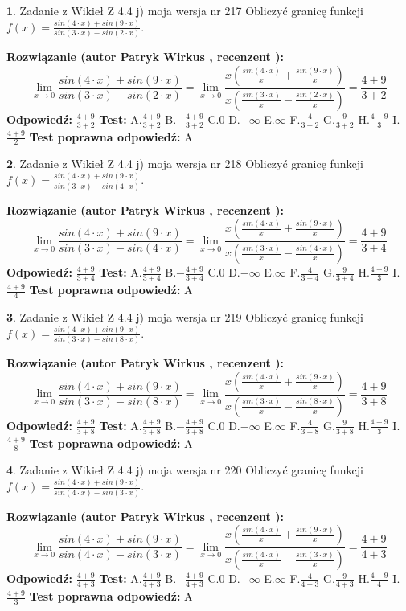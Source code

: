 \documentclass[12pt, a4paper]{article}
\theoremstyle{definition} %
\newtheorem{zad}{}
\newcommand{\zadStart}[1]{\begin{zad}#1\newline}
\newcommand{\zadStop}{\end{zad}}
\newcommand{\rozwStart}[2]{\noindent \textbf{Rozwiązanie (autor #1 , recenzent #2): }\newline}
\newcommand{\rozwStop}{\newline}
\newcommand{\odpStart}{\noindent \textbf{Odpowiedź:}\newline}
\newcommand{\odpStop}{\newline}
\newcommand{\testStart}{\noindent \textbf{Test:}\newline}
\newcommand{\testStop}{\newline}
\newcommand{\kluczStart}{\noindent \textbf{Test poprawna odpowiedź:}\newline}
\newcommand{\kluczStop}{\newline}
\begin{document}
\zadStart{Zadanie z Wikieł Z 4.4 j) moja wersja nr 217}
Obliczyć granicę funkcji $f(x)=\frac{sin(4\cdot x) +sin(9\cdot x)}{sin(3\cdot x) -sin(2\cdot x)}$.
\zadStop
\rozwStart{Patryk Wirkus}{}
$$\lim\limits_{x\to 0}\frac{sin(4\cdot x) +sin(9\cdot x)}{sin(3\cdot x) -sin(2\cdot x)}=\lim\limits_{x\to 0}\frac{x(\frac{sin(4\cdot x)}{x}+\frac{sin(9\cdot x)}{x})}{x(\frac{sin(3\cdot x)}{x}-\frac{sin(2\cdot x)}{x})}=\frac{4+9}{3+2}$$
\rozwStop
\odpStart
$\frac{4+9}{3+2}$
\odpStop
\testStart
A.$\frac{4+9}{3+2}$
B.$-\frac{4+9}{3+2}$
C.$0$
D.$-\infty$
E.$\infty$
F.$\frac{4}{3+2}$
G.$\frac{9}{3+2}$
H.$\frac{4+9}{3}$
I.$\frac{4+9}{2}$
\testStop
\kluczStart
A
\kluczStop



\zadStart{Zadanie z Wikieł Z 4.4 j) moja wersja nr 218}
Obliczyć granicę funkcji $f(x)=\frac{sin(4\cdot x) +sin(9\cdot x)}{sin(3\cdot x) -sin(4\cdot x)}$.
\zadStop
\rozwStart{Patryk Wirkus}{}
$$\lim\limits_{x\to 0}\frac{sin(4\cdot x) +sin(9\cdot x)}{sin(3\cdot x) -sin(4\cdot x)}=\lim\limits_{x\to 0}\frac{x(\frac{sin(4\cdot x)}{x}+\frac{sin(9\cdot x)}{x})}{x(\frac{sin(3\cdot x)}{x}-\frac{sin(4\cdot x)}{x})}=\frac{4+9}{3+4}$$
\rozwStop
\odpStart
$\frac{4+9}{3+4}$
\odpStop
\testStart
A.$\frac{4+9}{3+4}$
B.$-\frac{4+9}{3+4}$
C.$0$
D.$-\infty$
E.$\infty$
F.$\frac{4}{3+4}$
G.$\frac{9}{3+4}$
H.$\frac{4+9}{3}$
I.$\frac{4+9}{4}$
\testStop
\kluczStart
A
\kluczStop



\zadStart{Zadanie z Wikieł Z 4.4 j) moja wersja nr 219}
Obliczyć granicę funkcji $f(x)=\frac{sin(4\cdot x) +sin(9\cdot x)}{sin(3\cdot x) -sin(8\cdot x)}$.
\zadStop
\rozwStart{Patryk Wirkus}{}
$$\lim\limits_{x\to 0}\frac{sin(4\cdot x) +sin(9\cdot x)}{sin(3\cdot x) -sin(8\cdot x)}=\lim\limits_{x\to 0}\frac{x(\frac{sin(4\cdot x)}{x}+\frac{sin(9\cdot x)}{x})}{x(\frac{sin(3\cdot x)}{x}-\frac{sin(8\cdot x)}{x})}=\frac{4+9}{3+8}$$
\rozwStop
\odpStart
$\frac{4+9}{3+8}$
\odpStop
\testStart
A.$\frac{4+9}{3+8}$
B.$-\frac{4+9}{3+8}$
C.$0$
D.$-\infty$
E.$\infty$
F.$\frac{4}{3+8}$
G.$\frac{9}{3+8}$
H.$\frac{4+9}{3}$
I.$\frac{4+9}{8}$
\testStop
\kluczStart
A
\kluczStop



\zadStart{Zadanie z Wikieł Z 4.4 j) moja wersja nr 220}
Obliczyć granicę funkcji $f(x)=\frac{sin(4\cdot x) +sin(9\cdot x)}{sin(4\cdot x) -sin(3\cdot x)}$.
\zadStop
\rozwStart{Patryk Wirkus}{}
$$\lim\limits_{x\to 0}\frac{sin(4\cdot x) +sin(9\cdot x)}{sin(4\cdot x) -sin(3\cdot x)}=\lim\limits_{x\to 0}\frac{x(\frac{sin(4\cdot x)}{x}+\frac{sin(9\cdot x)}{x})}{x(\frac{sin(4\cdot x)}{x}-\frac{sin(3\cdot x)}{x})}=\frac{4+9}{4+3}$$
\rozwStop
\odpStart
$\frac{4+9}{4+3}$
\odpStop
\testStart
A.$\frac{4+9}{4+3}$
B.$-\frac{4+9}{4+3}$
C.$0$
D.$-\infty$
E.$\infty$
F.$\frac{4}{4+3}$
G.$\frac{9}{4+3}$
H.$\frac{4+9}{4}$
I.$\frac{4+9}{3}$
\testStop
\kluczStart
A
\kluczStop
\end{document}

